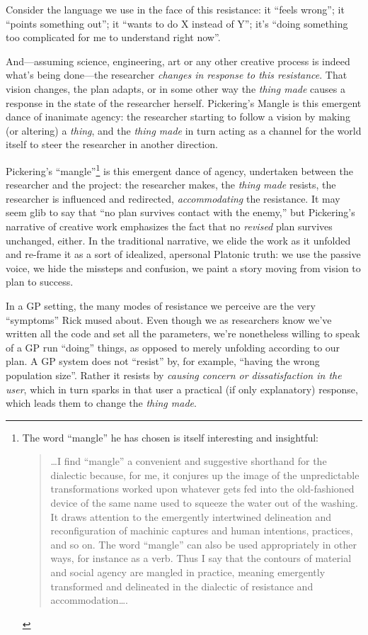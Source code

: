 Consider the language we use in the face of this resistance: it ``feels wrong''; it ``points something out''; it ``wants to do X instead of Y''; it's ``doing something too complicated for me to understand right now''.

And---assuming science, engineering, art or any other creative process is indeed what's being done---the researcher \emph{changes in response to this resistance}. That vision changes, the plan adapts, or in some other way the \emph{thing made} causes a response in the state of the researcher herself. Pickering's Mangle is this emergent dance of inanimate agency: the researcher starting to follow a vision by making (or altering) a \emph{thing}, and the \emph{thing made} in turn acting as a channel for the world itself to steer the researcher in another direction.

Pickering's ``mangle''\footnote{The word ``mangle'' he has chosen is itself interesting and insightful:

\begin{quote}
\ldots{}I find ``mangle'' a convenient and suggestive shorthand for the dialectic because, for me, it conjures up the image of the unpredictable transformations worked upon whatever gets fed into the old-fashioned device of the same name used to squeeze the water out of the washing. It draws attention to the emergently intertwined delineation and reconfiguration of machinic captures and human intentions, practices, and so on. The word ``mangle'' can also be used appropriately in other ways, for instance as a verb. Thus I say that the contours of material and social agency are mangled in practice, meaning emergently transformed and delineated in the dialectic of resistance and accommodation\ldots{}.
\end{quote}} is this emergent dance of agency, undertaken between the researcher and the project: the researcher makes, the \emph{thing made} resists, the researcher is influenced and redirected, \emph{accommodating} the resistance. It may seem glib to say that ``no plan survives contact with the enemy,'' but Pickering's narrative of creative work emphasizes the fact that no \emph{revised} plan survives unchanged, either. In the traditional narrative, we elide the work as it unfolded and re-frame it as a sort of idealized, apersonal Platonic truth: we use the passive voice, we hide the missteps and confusion, we paint a story moving from vision to plan to success.

In a GP setting, the many modes of resistance we perceive are the very ``symptoms'' Rick mused about. Even though we as researchers know we've written all the code and set all the parameters, we're nonetheless willing to speak of a GP run ``doing'' things, as opposed to merely unfolding according to our plan. A GP system does not ``resist'' by, for example, ``having the wrong population size''. Rather it resists by \emph{causing concern or dissatisfaction in the user}, which in turn sparks in that user a practical (if only explanatory) response, which leads them to change the \emph{thing made}.

